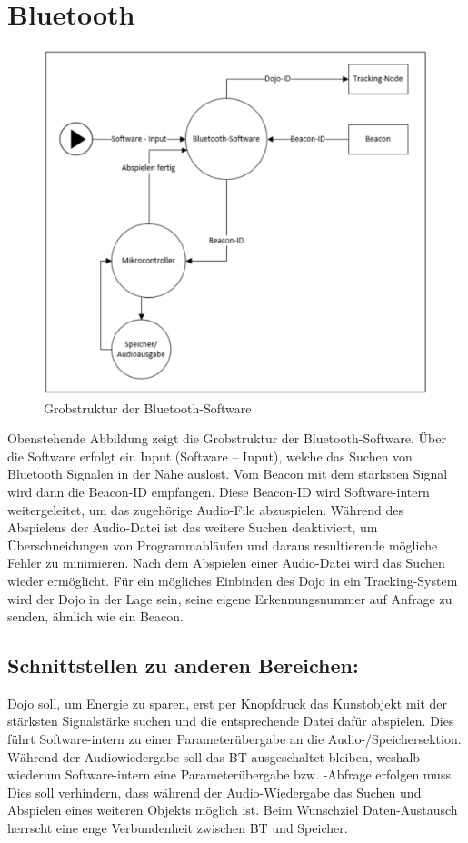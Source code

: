 \section{Bluetooth}

\begin{figure}[H]
\begin{center}
	\includegraphics[width=120mm]{data/Bluetooth.png}
	\caption{Grobstruktur der Bluetooth-Software} %
	\label{fig:bluetooth_grobstruktur}
\end{center}
\end{figure}

Obenstehende Abbildung zeigt die Grobstruktur der Bluetooth-Software. Über die Software erfolgt ein Input (Software – Input), welche das Suchen von Bluetooth Signalen in der Nähe auslöst. Vom Beacon mit dem stärksten Signal wird dann die Beacon-ID empfangen. Diese Beacon-ID wird Software-intern weitergeleitet, um das zugehörige Audio-File abzuspielen. Während des Abspielens der Audio-Datei ist das weitere Suchen deaktiviert, um Überschneidungen von Programmabläufen und daraus resultierende mögliche Fehler zu minimieren. Nach dem Abspielen einer Audio-Datei wird das Suchen wieder ermöglicht. Für ein mögliches Einbinden des Dojo in ein Tracking-System wird der Dojo in der Lage sein, seine eigene Erkennungsnummer auf Anfrage zu senden, ähnlich wie ein Beacon. 
\subsection{Schnittstellen zu anderen Bereichen:}
Dojo soll, um Energie zu sparen, erst per Knopfdruck das Kunstobjekt mit der stärksten Signalstärke suchen und die entsprechende Datei dafür abspielen. Dies führt Software-intern zu einer Parameterübergabe an die Audio-/Speichersektion. Während der Audiowiedergabe soll das BT ausgeschaltet bleiben, weshalb wiederum Software-intern eine Parameterübergabe bzw. -Abfrage erfolgen muss. Dies soll verhindern, dass während der Audio-Wiedergabe das Suchen und Abspielen eines weiteren Objekts möglich ist. Beim Wunschziel Daten-Austausch herrscht eine enge Verbundenheit zwischen BT und Speicher. 
